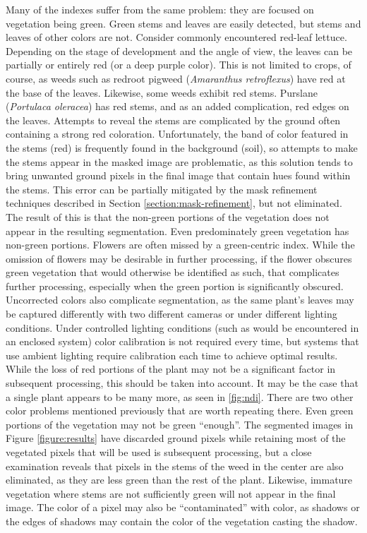 \documentclass[letterpaper, notitlepage]{report}
\begin{document}
{\label{section:problems-color}
Many of the indexes suffer from the same problem: they are focused on vegetation being green. Green stems and leaves are easily detected, but stems and leaves of other colors are not. Consider commonly encountered red-leaf lettuce. Depending on the stage of development and the angle of view, the leaves can be partially or entirely red (or a deep purple color). This is not limited to crops, of course, as weeds such as redroot pigweed (\textit{Amaranthus retroflexus}) have red at the base of the leaves. Likewise, some weeds exhibit red stems. Purslane (\textit{Portulaca oleracea}) has red stems, and as an added complication, red edges on the leaves. Attempts to reveal the stems are complicated by the ground often containing a strong red coloration. Unfortunately, the band of color featured in the stems (red) is frequently found in the background (soil), so attempts to make the stems appear in the masked image are problematic, as this solution tends to bring unwanted ground pixels in the final image that contain hues found within the stems. This error can be partially mitigated by the mask refinement techniques described in Section \ref{section:mask-refinement}, but not eliminated. The result of this is that the non-green portions of the vegetation does not appear in the resulting segmentation.  Even predominately green vegetation has non-green portions. Flowers are often missed by a green-centric index. While the omission of flowers may be desirable in further processing, if the flower obscures green vegetation that would otherwise be identified as such, that complicates further processing, especially when the green portion is significantly obscured. Uncorrected colors also complicate segmentation, as the same plant's leaves may be captured differently with two different cameras or under different lighting conditions. Under controlled lighting conditions (such as would be encountered in an enclosed system) color calibration is not required every time, but systems that use ambient lighting require calibration each time to achieve optimal results. While the loss of red portions of the plant may not be a significant factor in subsequent processing, this should be taken into account. It may be the case that a single plant appears to be many more, as seen in \ref{fig:ndi}.
There are two other color problems mentioned previously that are worth repeating there. Even green portions of the vegetation may not be green ``enough''. The segmented images in Figure \ref{figure:results} have discarded ground pixels while retaining most of the vegetated pixels that will be used is subsequent processing, but a close examination reveals that pixels in the stems of the weed in the center are also eliminated, as they are less green than the rest of the plant. Likewise, immature vegetation where stems are not sufficiently green will not appear in the final image. The color of a pixel may also be ``contaminated'' with color, as shadows or the edges of shadows may contain the color of the vegetation casting the shadow.
}
\end{document}
